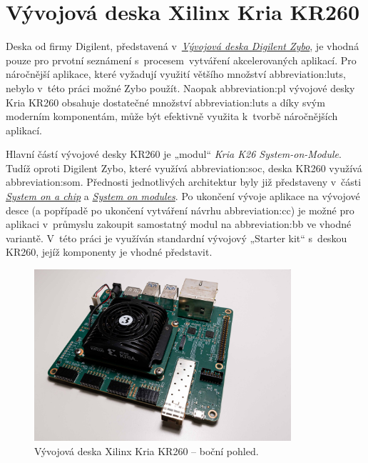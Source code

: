 \documentclass[a4paper, twoside, 11pt]{article}
\begin{document}
		\section{Vývojová deska Xilinx Kria KR260}
				Deska od firmy Digilent, představená v~\hyperref[sec:vyvojova-deska-digilent-zybo]{\textit{Vývojová deska Digilent Zybo}}, je vhodná pouze pro prvotní seznámení s~procesem~vytváření akcelerovaných aplikací. Pro náročnější aplikace, které vyžadují využití většího množství \gls{abbreviation:luts}, nebylo v~této práci možné Zybo použít. Naopak \gls{abbreviation:pl} vývojové desky Kria KR260 obsahuje dostatečné množství \gls{abbreviation:luts} a díky svým moderním komponentám, může být efektivně využita k~tvorbě náročnějších aplikací.\par
				Hlavní částí vývojové desky KR260 je „modul“ \textit{Kria K26 System-on-Module}. Tudíž oproti Digilent Zybo, které využívá \gls{abbreviation:soc}, deska KR260 využívá \gls{abbreviation:som}. Přednosti jednotlivých architektur byly již představeny v~části \hyperref[sec:system-on-a-chip]{\textit{System on a chip}} a \hyperref[sec:system-on-modules]{\textit{System on modules}}. Po ukončení vývoje aplikace na vývojové desce (a popřípadě po ukončení vytváření návrhu \gls{abbreviation:cc}) je možné pro aplikaci v~průmyslu zakoupit samostatný modul na \gls{abbreviation:bb} ve vhodné variantě. V~této práci je využíván standardní vývojový „Starter kit“ s~deskou KR260, jejíž komponenty je vhodné představit.

				\begin{figure}[H]
					\centering
						\includegraphics[width=0.85\textwidth]{src/jpg/xilinx-kria-foto-1.jpeg} 
						\caption{Vývojová deska Xilinx Kria KR260 – boční pohled.}
						\label{fig:xilinx-kria-foto-1}
				\end{figure}
\end{document}
